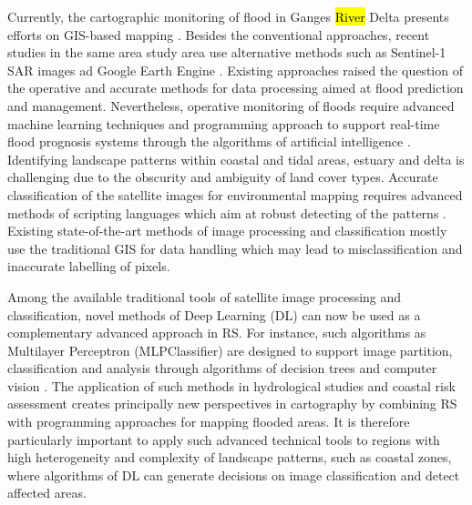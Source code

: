 \documentclass[water,article,submit,pdftex,moreauthors]{Definitions/mdpi}
\begin{document}
Currently, the cartographic monitoring of flood in Ganges \hl{River} Delta presents efforts on GIS-based mapping \cite{Sanyal2023,ISLAM2023167,RANA2023}. Besides the conventional approaches, recent studies in the same area study area use alternative methods such as Sentinel-1 SAR images ad Google Earth Engine \cite{ChakmaAkter,SINGHA2020278}. Existing approaches raised the question of the operative and accurate methods for data processing aimed at flood prediction and management. Nevertheless, operative monitoring of floods require advanced machine learning techniques and programming approach to support real-time flood prognosis systems through the algorithms of artificial intelligence \cite{ZHAO2021126777}. Identifying landscape patterns within coastal and tidal areas, estuary and delta is challenging due to the obscurity and ambiguity of land cover types. Accurate classification of the satellite images for environmental mapping requires advanced methods of scripting languages which aim at robust detecting of the patterns \cite{YANG2020100413,Lemenkova202322,BEVERIDGE2020104843,SADIQ2023111233,Lemenkova202227}. Existing state-of-the-art methods of image processing and classification mostly use the traditional GIS for data handling which may lead to misclassification and inaccurate labelling of pixels. 

Among the available traditional tools of satellite image processing and classification, novel methods of Deep Learning (DL) can now be used as a complementary advanced approach in RS. For instance, such algorithms as Multilayer Perceptron (MLPClassifier) are designed to support image partition, classification and analysis through algorithms of decision trees and computer vision \cite{6493388,6422192,7507955}. The application of such methods in hydrological studies and coastal risk assessment creates principally new perspectives in cartography by combining RS with programming approaches for mapping flooded areas. It is therefore particularly important to apply such advanced technical tools to regions with high heterogeneity and complexity of landscape patterns, such as coastal zones, where algorithms of DL can generate decisions on image classification and detect affected areas. 
\end{document}
